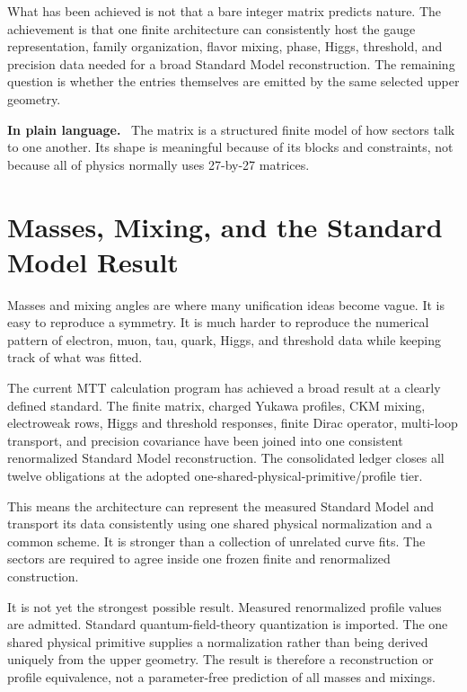 \documentclass[11pt,openany]{book}
\newenvironment{plainsummary}
  {\par\small\noindent\textbf{In plain language.}\ }
  {\par}
\begin{document}
What has been achieved is not that a bare integer matrix predicts nature.
The achievement is that one finite architecture can consistently host the
gauge representation, family organization, flavor mixing, phase, Higgs,
threshold, and precision data needed for a broad Standard Model
reconstruction. The remaining question is whether the entries themselves are
emitted by the same selected upper geometry.

\begin{plainsummary}
The matrix is a structured finite model of how sectors talk to one another.
Its shape is meaningful because of its blocks and constraints, not because
all of physics normally uses 27-by-27 matrices.
\end{plainsummary}

\chapter{Masses, Mixing, and the Standard Model Result}

Masses and mixing angles are where many unification ideas become vague. It is
easy to reproduce a symmetry. It is much harder to reproduce the numerical
pattern of electron, muon, tau, quark, Higgs, and threshold data while keeping
track of what was fitted.

The current MTT calculation program has achieved a broad result at a clearly
defined standard. The finite matrix, charged Yukawa profiles, CKM mixing,
electroweak rows, Higgs and threshold responses, finite Dirac operator,
multi-loop transport, and precision covariance have been joined into one
consistent renormalized Standard Model reconstruction. The consolidated
ledger closes all twelve obligations at the adopted
one-shared-physical-primitive/profile tier.

This means the architecture can represent the measured Standard Model and
transport its data consistently using one shared physical normalization and a
common scheme. It is stronger than a collection of unrelated curve fits.
The sectors are required to agree inside one frozen finite and renormalized
construction.

It is not yet the strongest possible result. Measured renormalized profile
values are admitted. Standard quantum-field-theory quantization is imported.
The one shared physical primitive supplies a normalization rather than being
derived uniquely from the upper geometry. The result is therefore a
reconstruction or profile equivalence, not a parameter-free prediction of
all masses and mixings.
\end{document}

